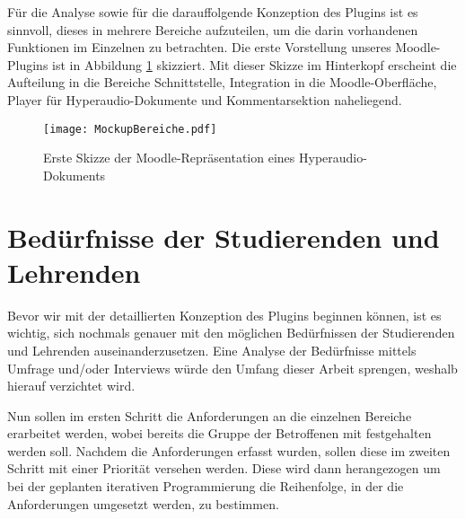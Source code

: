 \label{cha:analyse}
Für die Analyse sowie für die darauffolgende Konzeption des Plugins ist es sinnvoll, dieses in mehrere Bereiche aufzuteilen, um die darin vorhandenen Funktionen im Einzelnen zu betrachten. Die erste Vorstellung unseres Moodle-Plugins ist in Abbildung \ref{fig:MockupBereiche} skizziert. Mit dieser Skizze im Hinterkopf erscheint die Aufteilung in die Bereiche Schnittstelle, Integration in die Moodle-Oberfläche, Player für Hyperaudio-Dokumente und Kommentarsektion naheliegend.

\begin{figure}[h!]
\texttt{[image: MockupBereiche.pdf]}
\caption{\label{fig:MockupBereiche}Erste Skizze der Moodle-Repräsentation eines Hyperaudio-Dokuments}
\end{figure}


\section{Bedürfnisse der Studierenden und Lehrenden}
Bevor wir mit der detaillierten Konzeption des Plugins beginnen können, ist es wichtig, sich nochmals genauer mit den möglichen Bedürfnissen der Studierenden und Lehrenden auseinanderzusetzen. Eine Analyse der Bedürfnisse mittels Umfrage und/oder Interviews würde den Umfang dieser Arbeit sprengen, weshalb hierauf verzichtet wird.

Nun sollen im ersten Schritt die Anforderungen an die einzelnen Bereiche erarbeitet werden, wobei bereits die Gruppe der Betroffenen mit festgehalten werden soll. Nachdem die Anforderungen erfasst wurden, sollen diese im zweiten Schritt mit einer Priorität versehen werden. Diese wird dann herangezogen um bei der geplanten iterativen Programmierung die Reihenfolge, in der die Anforderungen umgesetzt werden, zu bestimmen.


